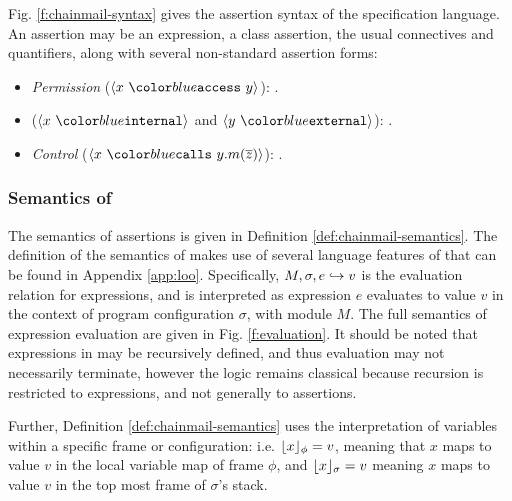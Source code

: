 
Fig. \ref{f:chainmail-syntax} gives the assertion syntax of the \SpecO specification language.
An assertion may be an expression, a class assertion, the usual connectives and quantifiers, along 
with several non-standard assertion forms:
\begin{itemize}
\item
\emph{Permission} ($\access{x}{y}$): %
  .
\item
{} ($\internal{x}$ and $\external{y}$): %
 .
\item
\emph{Control} ($\calls{x}{y}{m}{\overline{z}}$): 
.
\end{itemize}

\subsubsection{Semantics of \SpecO}
The semantics of \SpecO assertions is given in Definition \ref{def:chainmail-semantics}. 
The definition of the semantics of \SpecO makes use of several language features of 
\Loo that can be found in Appendix \ref{app:loo}. Specifically, $M, \sigma, e \hookrightarrow v$
is the evaluation relation for expressions, and is interpreted as expression $e$ evaluates
to value $v$ in the context of program configuration $\sigma$, with module $M$. The full
semantics of expression evaluation are given in Fig. \ref{f:evaluation}. It should 
be noted that expressions in \Loo may be recursively defined, and thus evaluation may not
necessarily terminate, however the logic remains classical because recursion is restricted
to expressions, and not generally to assertions.

Further, Definition \ref{def:chainmail-semantics} uses the interpretation of variables
within a specific frame or configuration: i.e. $\lfloor x \rfloor_{\phi} = v$, meaning that $x$ maps to
value $v$ in the local variable map of frame $\phi$, and $\lfloor x \rfloor_{\sigma} = v$ meaning $x$ 
maps to value $v$ in the top most frame of $\sigma$'s stack.

